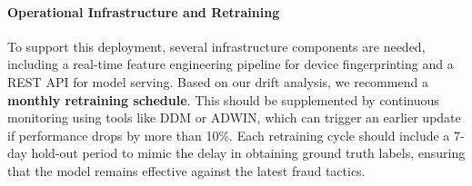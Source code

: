 \paragraph{Operational Infrastructure and Retraining}

To support this deployment, several infrastructure components are needed, including a real-time feature engineering pipeline for device fingerprinting and a REST API for model serving. Based on our drift analysis, we recommend a \textbf{monthly retraining schedule}. This should be supplemented by continuous monitoring using tools like DDM or ADWIN, which can trigger an earlier update if performance drops by more than 10\%. Each retraining cycle should include a 7-day hold-out period to mimic the delay in obtaining ground truth labels, ensuring that the model remains effective against the latest fraud tactics.

